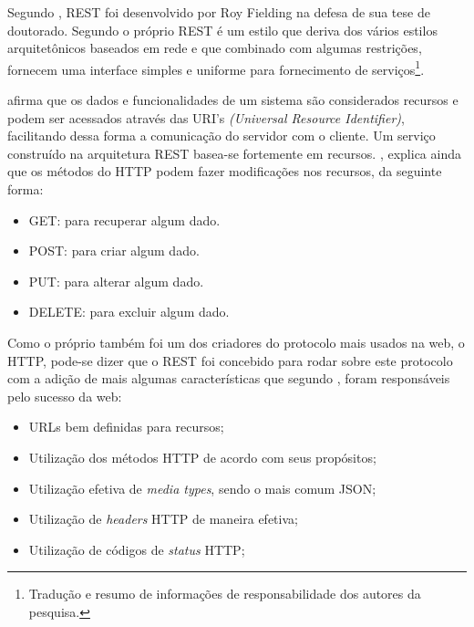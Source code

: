 	
	\par Segundo , REST foi desenvolvido por Roy Fielding
na defesa de sua tese de doutorado. Segundo o próprio 
REST é um estilo que deriva dos vários estilos arquitetônicos baseados em rede
e  que combinado com algumas restrições, fornecem uma interface simples e
uniforme para fornecimento de serviços\footnote{Tradução e resumo de
informações de responsabilidade dos autores da pesquisa.}.
			
	\par {} afirma que os dados e funcionalidades de um sistema
são considerados recursos e podem ser acessados através das URI's
\textit{(Universal Resource Identifier)}, facilitando dessa forma a comunicação
do servidor com o cliente. Um serviço construído na arquitetura REST basea-se
fortemente em recursos. , explica ainda que os métodos
do HTTP podem fazer modificações nos recursos, da seguinte forma:
	
	\begin{itemize}
		
		\item GET: para recuperar algum dado. 
		
		\item POST: para criar algum dado.
		
		\item PUT: para alterar algum dado. 
		
		\item DELETE: para excluir algum dado. 
	
	\end{itemize}

	\par Como o próprio  também foi um dos criadores do
protocolo mais usados na web, o HTTP, pode-se dizer que o REST foi concebido
para rodar sobre este protocolo com a adição de mais algumas características
que segundo , foram responsáveis pelo sucesso da web:
		
	\begin{itemize}
		
		\item URLs bem definidas para recursos;
		
		\item Utilização dos métodos HTTP de acordo com seus propósitos;
			
		\item Utilização efetiva de \textit{media types}, sendo o mais comum JSON;
		
		\item Utilização de \textit{headers} HTTP de maneira efetiva;
		
		\item Utilização de códigos de \textit{status} HTTP;
	
	\end{itemize}
			 
